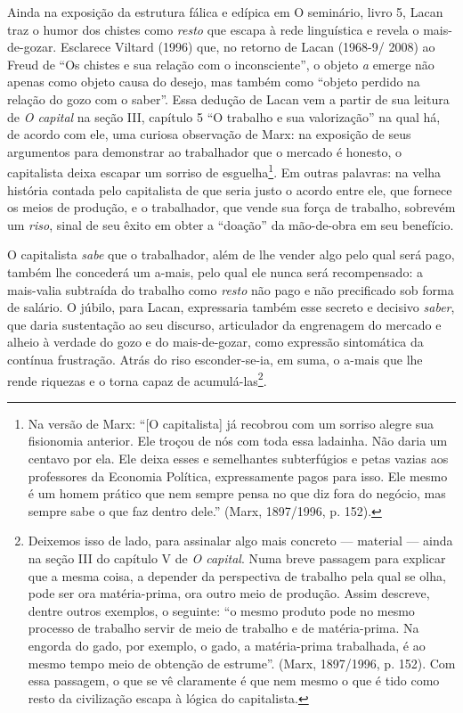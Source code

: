 Ainda na exposição da estrutura fálica e edípica em O seminário, livro
5, Lacan traz o humor dos chistes como \emph{resto} que escapa à rede
linguística e revela o mais-de-gozar. Esclarece Viltard (1996) que, no
retorno de Lacan (1968-9/ 2008) ao Freud de ``Os chistes e sua relação
com o inconsciente'', o objeto \emph{a} emerge não apenas como objeto
causa do desejo, mas também como ``objeto perdido na relação do gozo com
o saber''. Essa dedução de Lacan vem a partir de sua leitura de \emph{O
capital} na seção III, capítulo 5 ``O trabalho e sua valorização'' na
qual há, de acordo com ele, uma curiosa observação de Marx: na exposição
de seus argumentos para demonstrar ao trabalhador que o mercado é
honesto, o capitalista deixa escapar um sorriso de esguelha\footnote{Na
  versão de Marx: ``{[}O capitalista{]} já recobrou com um sorriso
  alegre sua fisionomia anterior. Ele troçou de nós com toda essa
  ladainha. Não daria um centavo por ela. Ele deixa esses e semelhantes
  subterfúgios e petas vazias aos professores da Economia Política,
  expressamente pagos para isso. Ele mesmo é um homem prático que nem
  sempre pensa no que diz fora do negócio, mas sempre sabe o que faz
  dentro dele.'' (Marx, 1897/1996, p. 152).}. Em outras palavras: na
velha história contada pelo capitalista de que seria justo o acordo
entre ele, que fornece os meios de produção, e o trabalhador, que vende
sua força de trabalho, sobrevém um \emph{riso}, sinal de seu êxito em
obter a ``doação'' da mão-de-obra em seu benefício.

O capitalista \emph{sabe} que o trabalhador, além de lhe vender algo
pelo qual será pago, também lhe concederá um a-mais, pelo qual ele nunca
será recompensado: a mais-valia subtraída do trabalho como \emph{resto}
não pago e não precificado sob forma de salário. O júbilo, para Lacan,
expressaria também esse secreto e decisivo \emph{saber}, que daria
sustentação ao seu discurso, articulador da engrenagem do mercado e
alheio à verdade do gozo e do mais-de-gozar, como expressão sintomática
da contínua frustração. Atrás do riso esconder-se-ia, em suma, o a-mais
que lhe rende riquezas e o torna capaz de acumulá-las\footnote{Deixemos
  isso de lado, para assinalar algo mais concreto --- material --- ainda
  na seção III do capítulo V de \emph{O capital}. Numa breve passagem
  para explicar que a mesma coisa, a depender da perspectiva de trabalho
  pela qual se olha, pode ser ora matéria-prima, ora outro meio de
  produção. Assim descreve, dentre outros exemplos, o seguinte: ``o
  mesmo produto pode no mesmo processo de trabalho servir de meio de
  trabalho e de matéria-prima. Na engorda do gado, por exemplo, o gado,
  a matéria-prima trabalhada, é ao mesmo tempo meio de obtenção de
  estrume''. (Marx, 1897/1996, p. 152). Com essa passagem, o que se vê
  claramente é que nem mesmo o que é tido como resto da civilização
  escapa à lógica do capitalista.}.

